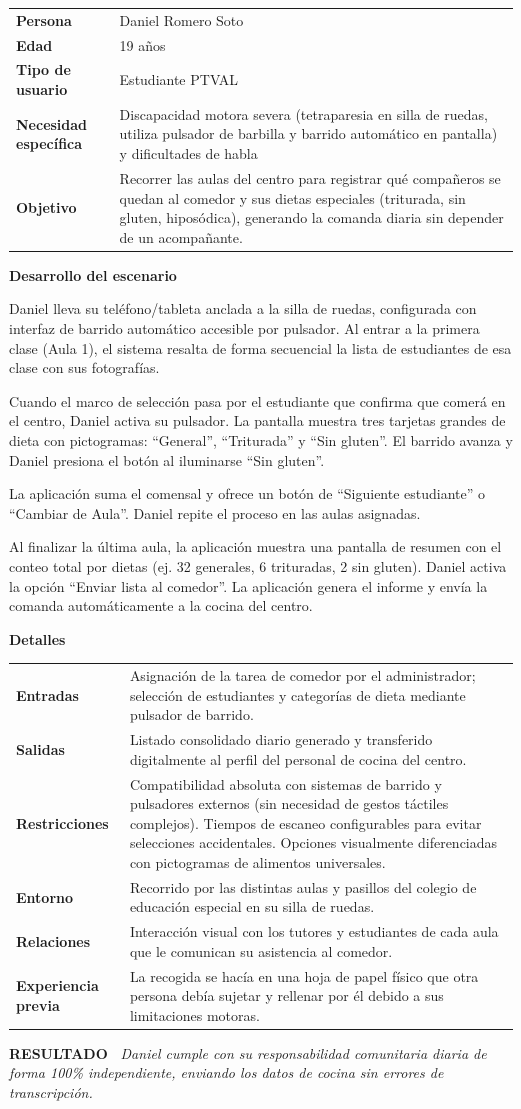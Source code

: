 \documentclass[11pt,a4paper]{article}
\makeatletter
\newcommand{\escenariocard}[6]{%
\needspace{10\baselineskip}
\begin{tcolorbox}[breakable,enhanced,colback=white,colframe=brandgreen,boxrule=0.8pt,arc=3pt,
 left=9pt,right=9pt,top=7pt,bottom=7pt,before skip=10pt,after skip=10pt,
 title={\textbf{\color{white}ESCENARIO #1} \\[1pt] {\small\color{tintgreen}#2}},
 colbacktitle=brandgreen,coltitle=white,fonttitle=\bfseries,boxed title style={colframe=brandgreen}]
{\setlength{\parskip}{0pt}\renewcommand{\arraystretch}{1.35}\rowcolors{1}{tintgreen}{white}\arrayrulecolor{white}
\begin{tabular}{@{\hspace{4pt}}>{\bfseries\color{brandgreen}}p{3.4cm}p{11.4cm}@{}}
#3 \\
\end{tabular}}
\vspace{6pt}
\textbf{\color{brandblue}Desarrollo del escenario}\par\vspace{2pt}
#4
\par\vspace{4pt}
\textbf{\color{brandblue}Detalles}\par\vspace{2pt}
{\setlength{\parskip}{0pt}\renewcommand{\arraystretch}{1.35}\rowcolors{1}{tintblue}{white}\arrayrulecolor{white}
\begin{tabular}{@{\hspace{4pt}}>{\bfseries\color{brandblue}}p{3.4cm}p{11.4cm}@{}}
#5 \\
\end{tabular}}
\vspace{6pt}
\begin{tcolorbox}[colback=tintblue,colframe=brandblue,boxrule=0pt,sharp corners,borderline west={3pt}{0pt}{brandblue},left=8pt,right=8pt,top=5pt,bottom=5pt]
\textbf{\small\color{brandblue}RESULTADO\ } {\small\itshape #6}
\end{tcolorbox}
\end{tcolorbox}
}
\makeatother
\begin{document}
\escenariocard{2}{Registro matutino del menú de comedor mediante pulsador adaptado}{%
Persona & Daniel Romero Soto \\
Edad & 19 años \\
Tipo de usuario & Estudiante PTVAL \\
Necesidad específica & Discapacidad motora severa (tetraparesia en silla de ruedas, utiliza pulsador de barbilla y barrido automático en pantalla) y dificultades de habla \\
Objetivo & Recorrer las aulas del centro para registrar qué compañeros se quedan al comedor y sus dietas especiales (triturada, sin gluten, hiposódica), generando la comanda diaria sin depender de un acompañante.
}{%
Daniel lleva su teléfono/tableta anclada a la silla de ruedas, configurada con interfaz de barrido automático accesible por pulsador. Al entrar a la primera clase (Aula 1), el sistema resalta de forma secuencial la lista de estudiantes de esa clase con sus fotografías.

Cuando el marco de selección pasa por el estudiante que confirma que comerá en el centro, Daniel activa su pulsador. La pantalla muestra tres tarjetas grandes de dieta con pictogramas: ``General'', ``Triturada'' y ``Sin gluten''. El barrido avanza y Daniel presiona el botón al iluminarse ``Sin gluten''.

La aplicación suma el comensal y ofrece un botón de ``Siguiente estudiante'' o ``Cambiar de Aula''. Daniel repite el proceso en las aulas asignadas.

Al finalizar la última aula, la aplicación muestra una pantalla de resumen con el conteo total por dietas (ej. 32 generales, 6 trituradas, 2 sin gluten). Daniel activa la opción ``Enviar lista al comedor''. La aplicación genera el informe y envía la comanda automáticamente a la cocina del centro.
}{%
Entradas & Asignación de la tarea de comedor por el administrador; selección de estudiantes y categorías de dieta mediante pulsador de barrido. \\
Salidas & Listado consolidado diario generado y transferido digitalmente al perfil del personal de cocina del centro. \\
Restricciones & Compatibilidad absoluta con sistemas de barrido y pulsadores externos (sin necesidad de gestos táctiles complejos). Tiempos de escaneo configurables para evitar selecciones accidentales. Opciones visualmente diferenciadas con pictogramas de alimentos universales. \\
Entorno & Recorrido por las distintas aulas y pasillos del colegio de educación especial en su silla de ruedas. \\
Relaciones & Interacción visual con los tutores y estudiantes de cada aula que le comunican su asistencia al comedor. \\
Experiencia previa & La recogida se hacía en una hoja de papel físico que otra persona debía sujetar y rellenar por él debido a sus limitaciones motoras.
}{Daniel cumple con su responsabilidad comunitaria diaria de forma 100\% independiente, enviando los datos de cocina sin errores de transcripción.}
\end{document}
